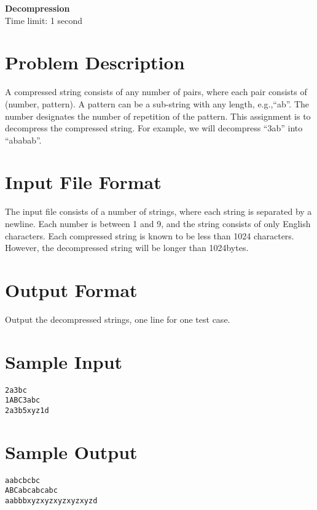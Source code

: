 \documentclass[12pt,a4paper]{article}
\begin{document}
\begin{center}
{\LARGE\textbf{Decompression}}\\
Time limit: 1 second
\end{center}

\section*{Problem Description}

A compressed string consists of any number of pairs, where each pair consists of (number, pattern). A pattern can be a sub-string with any length, e.g.,``ab''. The number designates the number of repetition of the pattern. This assignment is to decompress the compressed string. For example, we will decompress ``3ab'' into ``ababab''.\\

\section*{Input File Format}

The input file consists of a number of strings, where each string is separated by a newline.
Each number is between 1 and 9, and the string consists of only English characters. Each compressed string is known to be less than 1024 characters. However, the decompressed string will be longer than 1024bytes.\\

\section*{Output Format}

Output the decompressed strings, one line for one test case.\\

\section*{Sample Input}
\begin{verbatim}
2a3bc
1ABC3abc
2a3b5xyz1d
\end{verbatim}

\section*{Sample Output}
\begin{verbatim}
aabcbcbc
ABCabcabcabc
aabbbxyzxyzxyzxyzxyzd
\end{verbatim}
\end{document}
